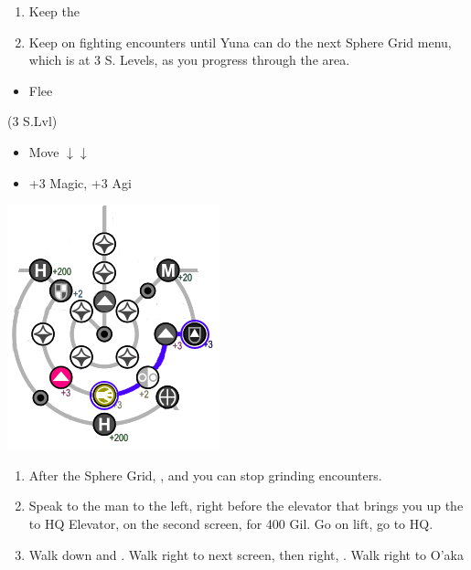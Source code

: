 \begin{enumerate}[resume]
	\item Keep the \formation{\kimahri}{\wakka}{\yuna}
	\item Keep on fighting encounters until Yuna can do the next Sphere Grid menu, which is at 3 S. Levels, as you progress through the area.
\end{enumerate}
\begin{encounters}
	\begin{itemize}
		\wakkaf Attack Raptors or Gandarewas
		\yunaf Defend
		\item Flee
	\end{itemize}
\end{encounters}
\begin{spheregrid}
	\begin{itemize}
		\yunaf (3 S.Lvl)
		\begin{itemize}
			\item Move $\downarrow\downarrow$
			\item +3 Magic, +3 Agi
		\end{itemize}
		\includegraphics{graphics/Yuna_MRR_2}
	\end{itemize}
\end{spheregrid}
\begin{enumerate}[resume]
	\item After the Sphere Grid, \formation{\tidus}{\yuna}{\wakka}, and you can stop grinding encounters.
	\item Speak to the man to the left, right before the elevator that brings you up the to HQ Elevator, on the second screen, for 400 Gil. Go on lift, go to HQ.
	\item Walk down and \sd. Walk right to next screen, then right, \sd. Walk right to O'aka
\end{enumerate}
